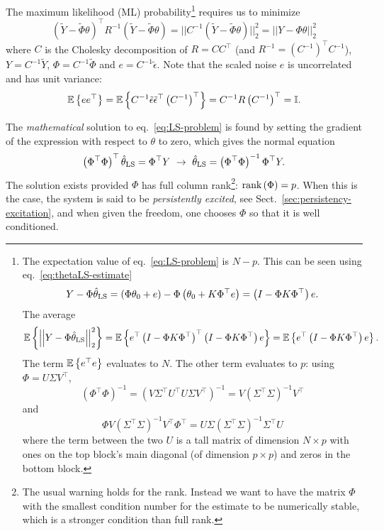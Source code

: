 The maximum likelihood (ML) probability\footnote{The expectation value of eq.~\eqref{eq:LS-problem} is $N-p$. This can be seen using eq.~\eqref{eq:thetaLS-estimate}
  \begin{equation*}
    Y-\Phi\hat{\theta}_\textrm{LS} = (\Phi\theta_0 + e) - \Phi\left(\theta_0 + K \Phi^\top e\right) = \left(I - \Phi K \Phi^\top\right)e.
  \end{equation*}
  The average
  \begin{equation*}
    \mathbb{E}\left\{\left|\left|Y - \Phi \hat{\theta}_\textrm{LS}\right|\right|_2^2\right\} = \mathbb{E}\left\{e^\top\left(I - \Phi K \Phi^\top\right)^\top\left(I - \Phi K \Phi^\top\right)e\right\} = \mathbb{E}\left\{e^\top\left(I - \Phi K \Phi^\top\right)e\right\}.
  \end{equation*}
  The term $\mathbb{E}\left\{e^\top e\right\}$ evaluates to $N$. The other term evaluates to $p$: using $\Phi = U\Sigma V^\top$,
  \begin{equation*}
    (\Phi^\top \Phi)^{-1} = \left(V\Sigma^\top U^\top U\Sigma V^\top\right)^{-1} = V\left(\Sigma^\top\Sigma\right)^{-1}V^\top
  \end{equation*}
  and
  \begin{equation*}
    \Phi V\left(\Sigma^\top\Sigma\right)^{-1}V^\top \Phi^\top = U\Sigma \left(\Sigma^\top\Sigma\right)^{-1}\Sigma^\top U
  \end{equation*}
where the term between the two $U$ is a tall matrix of dimension $N\times p$ with ones on the top block's main diagonal (of dimension $p\times p$) and zeros in the bottom block.} requires us to minimize
\begin{equation}
  \label{eq:LS-problem}
  (\tilde{Y} - \tilde{\Phi} \theta)^\top R^{-1} (\tilde{Y} - \tilde{\Phi} \theta) = ||C^{-1} (\tilde{Y} - \tilde{\Phi} \theta)||_2^2 = ||Y - \Phi \theta||_2^2
\end{equation}
where $C$ is the Cholesky decomposition of $R = C C^\top$ (and $R^{-1} = \left(C^{-1}\right)^\top C^{-1}$), $Y = C^{-1}\tilde{Y}$, $\Phi = C^{-1}\tilde{\Phi}$ and $e=C^{-1}\tilde{\epsilon}$. Note that the scaled noise $e$ is uncorrelated and has unit variance:
\begin{equation*}
  \mathbb{E}\left\{e e^\top\right\} = \mathbb{E}\left\{C^{-1}\tilde{\epsilon} \tilde{\epsilon}^\top \left(C^{-1}\right)^\top\right\} = C^{-1}R \left(C^{-1}\right)^\top = \mathbb{I}.
\end{equation*}

The \emph{mathematical} solution to eq.~\eqref{eq:LS-problem} is found by setting the gradient of the expression with respect to $\theta$ to zero, which gives the normal equation
\begin{equation}
  \label{eq:LS-estimator}
  \left(\Phi^\top\Phi\right)^\top \thetaLS = \Phi^\top Y\ \rightarrow\ \thetaLS = \left(\Phi^\top \Phi\right)^{-1} \Phi^\top Y.
\end{equation}
The solution exists provided $\Phi$ has full column rank\footnote{The usual warning holds for the rank. Instead we want to have the matrix $\Phi$ with the smallest condition number for the estimate to be numerically stable, which is a stronger condition than full rank.}: $\textrm{rank}\left(\Phi\right) = p$. When this is the case, the system is said to be \emph{persistently excited}, see Sect.~\ref{sec:persistency-excitation}, and when given the freedom, one chooses $\Phi$ so that it is well conditioned.


